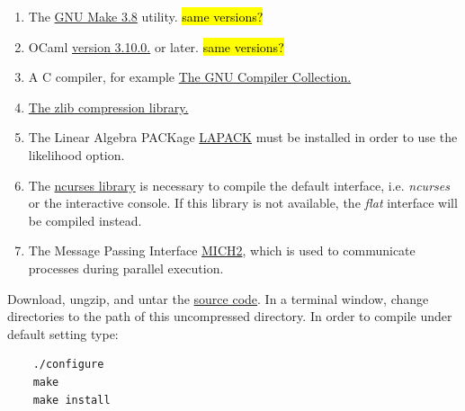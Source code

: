 \begin{enumerate}
    \item The \href{http://www.gnu.org/software/make/}{GNU Make 3.8} utility. \hl{same versions?}
    \item OCaml \href{http://www.ocaml.org}{version 3.10.0.} or later. \hl{same versions?}
    \item A C compiler, for example \href{http://gcc.gnu.org/} {The GNU Compiler Collection.}
    \item \href{http://www.zlib.net}{The zlib compression library.}
    \item The Linear Algebra PACKage \href {http://www.netlib.org/lapack/}{LAPACK} must be installed in order to use the likelihood option.
    \item The \href{http://www.gnu.org/s/ncurses} {ncurses library} is necessary to compile the default interface, i.e. \emph{ncurses} or the interactive console. If this library is not available, the \emph{flat} interface will be compiled instead.
   \item The Message Passing Interface \href{http://www-unix.mcs.anl.gov/mpi/}{MICH2}, which is used to communicate processes during parallel execution.
\end{enumerate}
Download, ungzip, and untar the
\href{http://research.amnh.org/scicomp/projects/poy.php}{\poy source code}.  In a terminal window, change directories to the path of this uncompressed directory.  In order to compile under default setting type:
\begin{verbatim}
	./configure
	make
	make install
\end{verbatim}

